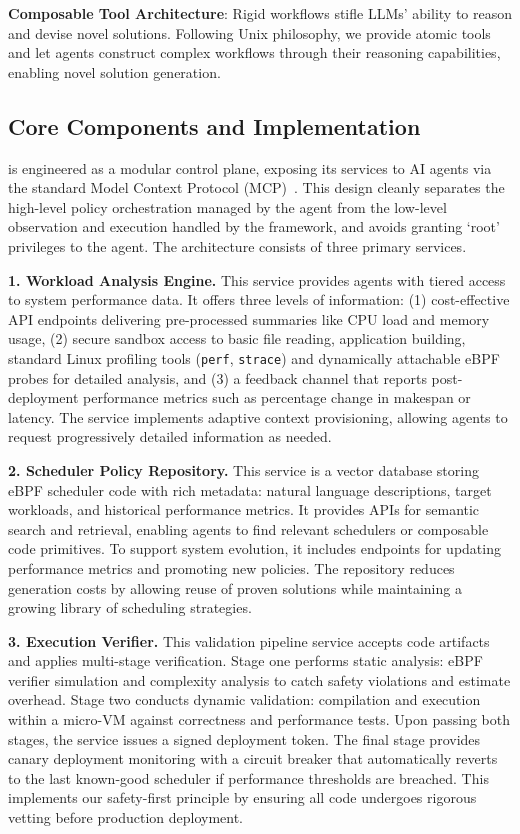 \textbf{Composable Tool Architecture}: Rigid workflows stifle LLMs' ability to reason and devise novel solutions. Following Unix philosophy, we provide atomic tools and let agents construct complex workflows through their reasoning capabilities, enabling novel solution generation.

\subsection{Core Components and Implementation}
\sys is engineered as a modular control plane, exposing its services to AI agents via the standard Model Context Protocol (MCP)~\cite{anthropic2024mcp}. This design cleanly separates the high-level policy orchestration managed by the agent from the low-level observation and execution handled by the framework, and avoids granting `root' privileges to the agent. The architecture consists of three primary services.

\textbf{1. Workload Analysis Engine.} This service provides agents with tiered access to system performance data. It offers three levels of information: (1) cost-effective API endpoints delivering pre-processed summaries like CPU load and memory usage, (2) secure sandbox access to basic file reading, application building, standard Linux profiling tools (\texttt{perf}, \texttt{strace}) and dynamically attachable eBPF probes for detailed analysis, and (3) a feedback channel that reports post-deployment performance metrics such as percentage change in makespan or latency. The service implements adaptive context provisioning, allowing agents to request progressively detailed information as needed.

\textbf{2. Scheduler Policy Repository.} This service is a vector database storing eBPF scheduler code with rich metadata: natural language descriptions, target workloads, and historical performance metrics. It provides APIs for semantic search and retrieval, enabling agents to find relevant schedulers or composable code primitives. To support system evolution, it includes endpoints for updating performance metrics and promoting new policies. The repository reduces generation costs by allowing reuse of proven solutions while maintaining a growing library of scheduling strategies.

\textbf{3. Execution Verifier.} This validation pipeline service accepts code artifacts and applies multi-stage verification. Stage one performs static analysis: eBPF verifier simulation and complexity analysis to catch safety violations and estimate overhead. Stage two conducts dynamic validation: compilation and execution within a micro-VM against correctness and performance tests. Upon passing both stages, the service issues a signed deployment token. The final stage provides canary deployment monitoring with a circuit breaker that automatically reverts to the last known-good scheduler if performance thresholds are breached. This implements our safety-first principle by ensuring all code undergoes rigorous vetting before production deployment.

